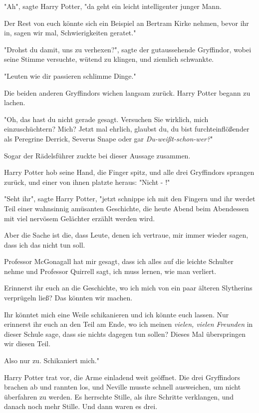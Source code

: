 {"Ah", sagte Harry Potter, "da geht ein leicht intelligenter junger Mann.

Der Rest von euch könnte sich ein Beispiel an Bertram Kirke nehmen, bevor ihr in, sagen wir mal, Schwierigkeiten geratet."

"Drohst du damit, uns zu verhexen?", sagte der gutaussehende Gryffindor, wobei seine Stimme versuchte, wütend zu klingen, und ziemlich schwankte.

"Leuten wie dir passieren schlimme Dinge."

Die beiden anderen Gryffindors wichen langsam zurück. Harry Potter begann zu lachen.

"Oh, das hast du nicht gerade gesagt. Versuchen Sie wirklich, mich einzuschüchtern? Mich? Jetzt mal ehrlich, glaubst du, du bist furchteinflößender als Peregrine Derrick, Severus Snape oder gar \emph{Du-weißt-schon-wer?}"

Sogar der Rädelsführer zuckte bei dieser Aussage zusammen.

Harry Potter hob seine Hand, die Finger spitz, und alle drei Gryffindors sprangen zurück, und einer von ihnen platzte heraus: "Nicht - !"

"Seht ihr", sagte Harry Potter, "jetzt schnippe ich mit den Fingern und ihr werdet Teil einer wahnsinnig amüsanten Geschichte, die heute Abend beim Abendessen mit viel nervösem Gelächter erzählt werden wird.

Aber die Sache ist die, dass Leute, denen ich vertraue, mir immer wieder sagen, dass ich das nicht tun soll.

Professor McGonagall hat mir gesagt, dass ich alles auf die leichte Schulter nehme und Professor Quirrell sagt, ich muss lernen, wie man verliert.

Erinnerst ihr euch an die Geschichte, wo ich mich von ein paar älteren Slytherins verprügeln ließ? Das könnten wir machen.

Ihr könntet mich eine Weile schikanieren und ich könnte euch lassen. Nur erinnerst ihr euch an den Teil am Ende, wo ich meinen \emph{vielen, vielen Freunden} in dieser Schule sage, dass sie nichts dagegen tun sollen? Dieses Mal überspringen wir diesen Teil.

Also nur zu. Schikaniert mich."

Harry Potter trat vor, die Arme einladend weit geöffnet. Die drei Gryffindors brachen ab und rannten los, und Neville musste schnell ausweichen, um nicht überfahren zu werden. Es herrschte Stille, als ihre Schritte verklangen, und danach noch mehr Stille. Und dann waren es drei.

}

